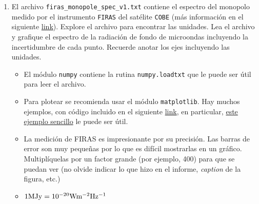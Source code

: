 \documentclass[letter, 11pt]{article}
\begin{document}
\begin{enumerate}
  
  \item El archivo \texttt{firas\_monopole\_spec\_v1.txt} contiene el espectro
    del monopolo medido por el instrumento \texttt{FIRAS} del satélite
    \texttt{COBE} (más información en el siguiente
    \href{https://lambda.gsfc.nasa.gov/product/cobe/firas_monopole_get.cfm}{link}).
    Explore el archivo para encontrar las unidades. Lea el archivo y grafique
    el espectro de la radiación de fondo de microondas incluyendo la
    incertidumbre de cada punto. Recuerde anotar los ejes incluyendo las unidades. 

    \begin{ayuda} 
      \small 
      \begin{itemize} 

        \item El módulo \texttt{numpy} contiene la rutina \texttt{numpy.loadtxt} que le puede
      ser útil para leer el archivo.  

        \item Para plotear se recomienda usar el módulo \texttt{matplotlib}.
          Hay muchos ejemplos, con código incluido en el siguiente
          \href{https://matplotlib.org/gallery.html}{link}, en particular,
          \href{https://matplotlib.org/examples/statistics/errorbar_demo.html}{este
          ejemplo sencillo} le puede ser útil.  

        \item La medición de FIRAS es impresionante por su precisión. Las
          barras de error son muy pequeñas por lo que es difícil mostrarlas en
          un gráfico. Multiplíquelas por un factor grande (por ejemplo, 400)
          para que se puedan ver (no olvide indicar lo que hizo en el informe,
          \emph{caption} de la figura, etc.)
        
        \item $1 {\rm MJy} = 10^{-20} {\rm W m^{-2} Hz^{-1}}$

      \end{itemize} 
    \end{ayuda}



\end{enumerate}
\end{document}
